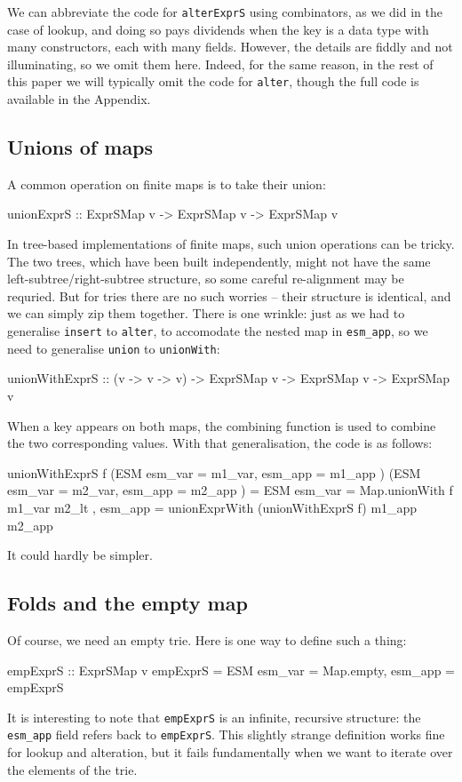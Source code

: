 \documentclass[acmsmall]{acmart}
\theoremstyle{theorem}
\theoremstyle{definition}
\theoremstyle{remark}
\begin{document}
We can abbreviate the code for \lstinline{alterExprS} using combinators, as we did in the case of
lookup, and doing so pays dividends when the key is a data type with
many constructors, each with many fields.  However, the details are
fiddly and not illuminating, so we omit them here.  Indeed, for the
same reason, in the rest of this paper we will typically omit the code
for \lstinline{alter}, though the full code is available in the
Appendix.

\subsection{Unions of maps}

A common operation on finite maps is to take their union:
\begin{code}
unionExprS :: ExprSMap v -> ExprSMap v -> ExprSMap v
\end{code}
In tree-based implementations of finite maps, such union operations can be tricky.
The two trees, which have been built independently, might not have the same
left-subtree/right-subtree structure, so some careful re-alignment may be requried.
But for tries there are no such worries --
their structure is identical, and we can simply zip them together.  There is one
wrinkle: just as we had to generalise \lstinline{insert} to \lstinline{alter},
to accomodate the nested map in \lstinline{esm_app}, so we need to generalise \lstinline{union} to \lstinline{unionWith}:
\begin{code}
unionWithExprS :: (v -> v -> v) -> ExprSMap v -> ExprSMap v -> ExprSMap v
\end{code}
When a key appears on both maps, the combining function is used to
combine the two corresponding values.
With that generalisation, the code is as follows:
\begin{code}
unionWithExprS f (ESM { esm_var = m1_var, esm_app = m1_app })
                 (ESM { esm_var = m2_var, esm_app = m2_app })
  = ESM { esm_var = Map.unionWith f m1_var m2_lt
        , esm_app = unionExprWith (unionWithExprS f) m1_app m2_app }
\end{code}
It could hardly be simpler.

\subsection{Folds and the empty map} \label{sec:fold}

Of course, we need an empty trie. Here is one way to define such a thing:
\begin{code}
empExprS :: ExprSMap v
empExprS = ESM { esm_var = Map.empty, esm_app = empExprS }
\end{code}
It is interesting to note that \lstinline{empExprS} is an infinite, recursive structure:
the \lstinline{esm_app} field refers back to \lstinline{empExprS}.
This slightly strange definition works fine for lookup and alteration, but it fails
fundamentally when we want to iterate over the elements of the trie.
\end{document}
